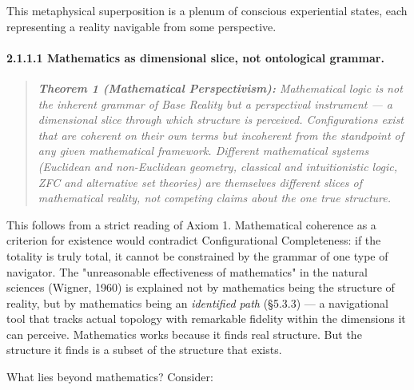 This metaphysical superposition is a plenum of conscious experiential states, each representing a reality navigable from some perspective.


\paragraph*{2.1.1.1 Mathematics as dimensional slice, not ontological grammar.}


\begin{quote}
\itshape
\textbf{Theorem 1 (Mathematical Perspectivism):} \textit{Mathematical logic is not the inherent grammar of Base Reality but a perspectival instrument — a dimensional slice through which structure is perceived. Configurations exist that are coherent on their own terms but incoherent from the standpoint of any given mathematical framework. Different mathematical systems (Euclidean and non-Euclidean geometry, classical and intuitionistic logic, ZFC and alternative set theories) are themselves different slices of mathematical reality, not competing claims about the one true structure.}
\end{quote}


This follows from a strict reading of Axiom 1. Mathematical coherence as a criterion for existence would contradict Configurational Completeness: if the totality is truly total, it cannot be constrained by the grammar of one type of navigator. The "unreasonable effectiveness of mathematics" in the natural sciences (Wigner, 1960) is explained not by mathematics being the structure of reality, but by mathematics being an \textit{identified path} (§5.3.3) — a navigational tool that tracks actual topology with remarkable fidelity within the dimensions it can perceive. Mathematics works because it finds real structure. But the structure it finds is a subset of the structure that exists.


What lies beyond mathematics? Consider:


